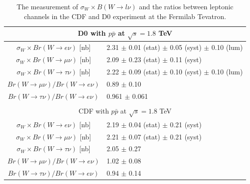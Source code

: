 \begin{table}[ht]
    \setlength{\tabcolsep}{2em}
    \renewcommand{\arraystretch}{1.2}
    \centering
    \begin{tabular}{ |c|l| } 
         
         \hline
         \multicolumn{2}{|c|}{D0 with $p\bar{p}$ at $\sqrt{s}=1.8$ TeV} \\
         \hline
         $\sigma_W \times Br(W\to e    \nu)$  [nb] \cite{Abbott:1999tt} & 2.31 $\pm$ 0.01 (stat) $\pm$ 0.05 (syst) $\pm$ 0.10 (lum) \\ 
         $\sigma_W \times Br(W\to \mu  \nu)$  [nb] \cite{Abachi:1995xc} & 2.09 $\pm$ 0.23 (stat) $\pm$ 0.11 (syst) \\ 
         $\sigma_W \times Br(W\to \tau \nu)$  [nb] \cite{Abbott:1999pk} & 2.22 $\pm$ 0.09 (stat) $\pm$ 0.10 (syst) $\pm$ 0.10 (lum)  \\ 
         \hline
         $Br(W\to \mu  \nu)/ Br(W\to e \nu)$ \cite{Abachi:1995xc} & 0.89  $\pm$ 0.10 \\
         $Br(W\to \tau \nu)/ Br(W\to e \nu)$ \cite{Abbott:1999pk} & 0.961 $\pm$ 0.061 \\
         
         \hline
         \multicolumn{2}{c}{} \\
         
         
         \hline
         \multicolumn{2}{|c|}{CDF with $p\bar{p}$ at $\sqrt{s}=1.8$ TeV} \\
         \hline
         $\sigma_W \times Br(W\to e    \nu)$  [nb] \cite{Abe:1990sd}    & 2.19 $\pm$ 0.04 (stat) $\pm$ 0.21 (syst) \\ 
         $\sigma_W \times Br(W\to \mu  \nu)$  [nb] \cite{Abe:1992ys}    & 2.21 $\pm$ 0.07 (stat) $\pm$ 0.21 (syst) \\ 
         $\sigma_W \times Br(W\to \tau \nu)$  [nb] \cite{Abe:1991fb}    & 2.05 $\pm$ 0.27 \\ 
         \hline
         $Br(W\to \mu  \nu)/ Br(W\to e \nu)$ \cite{Abe:1992ys} & 1.02  $\pm$ 0.08 \\
         $Br(W\to \tau \nu)/ Br(W\to e \nu)$ \cite{Abe:1991fb} & 0.94  $\pm$ 0.14 \\

         \hline
    \end{tabular}
    \caption{The measurement of $\sigma_W \times B(W\to l \nu)$ and the ratios between leptonic channels in the CDF and D0 experiment at the Fermilab Tevatron.}
    \label{tab:relatedWorks:lu:W:tevatron}
\end{table}



